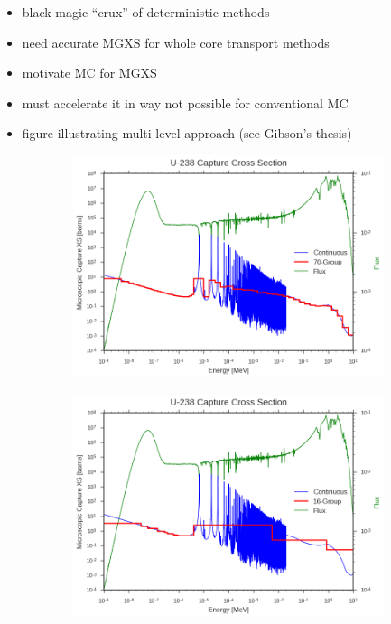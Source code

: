 \begin{itemize}[noitemsep]
  \item black magic ``crux'' of deterministic methods
  \item need accurate \ac{MGXS} for whole core transport methods
  \item motivate \ac{MC} for \ac{MGXS}
  \item must accelerate it in way not possible for conventional \ac{MC}
  \item figure illustrating multi-level approach (see Gibson's thesis)
\end{itemize}

\begin{figure}
\begin{subfigure}{\textwidth}
  \centering
  \includegraphics[width=0.9\linewidth]{figures/intro/u238-capture-70}
  \caption{}
\end{subfigure}
\begin{subfigure}{\textwidth}
  \centering
  \includegraphics[width=0.9\linewidth]{figures/intro/u238-capture-16}

\end{subfigure}
\end{figure}
